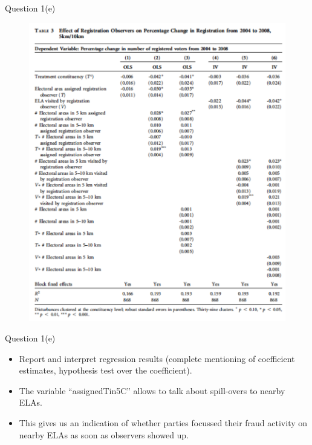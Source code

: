 \documentclass[xcolor=table,dvipsnames]{beamer}
\begin{document}
\begin{frame}{Question 1(e)}
\begin{figure}[H]\centering
\includegraphics[scale=.35]{pictures/ichinoSchuendeln_results.pdf}
\end{figure}
\end{frame}

\begin{frame}{Question 1(e)}
\begin{itemize}
\item Report and interpret regression results (complete mentioning of coefficient estimates, hypothesis test over the coefficient). \pause
\item The variable ``assignedTin5C'' allows to talk about spill-overs to nearby ELAs. \pause
\item This gives us an indication of whether parties focussed their fraud activity on nearby ELAs as soon as observers showed up.
\end{itemize}
\end{frame}
\end{document}
